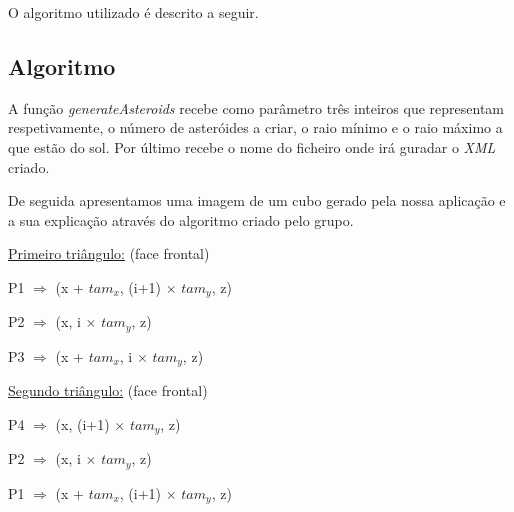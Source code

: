 \documentclass[a4paper]{article}
\begin{document}
O algoritmo utilizado é descrito a seguir.

\subsection{Algoritmo}
A função \textit{generateAsteroids} recebe como parâmetro três inteiros que representam respetivamente, o número de asteróides a criar, o raio mínimo e o raio máximo a que estão do sol. Por último recebe o nome do ficheiro onde irá guradar o \emph{XML} criado.

De seguida apresentamos uma imagem de um cubo gerado pela nossa aplicação e a sua explicação através do algoritmo criado pelo grupo.

 \vspace{0.5cm}

      \underline{Primeiro triângulo:} (face frontal)

      \vspace{0.5cm}

          \hspace{0.5cm} P1 $\Rightarrow$ (x + $tam_{x}$, (i+1) $\times$ $tam_{y}$, z)

      \vspace{0.2cm}

          \hspace{0.5cm} P2 $\Rightarrow$ (x, i $\times$ $tam_{y}$, z)

      \vspace{0.2cm}

          \hspace{0.5cm} P3 $\Rightarrow$ (x + $tam_{x}$, i $\times$ $tam_{y}$, z)

      \vspace{0.5cm}

      \underline{Segundo triângulo:} (face frontal)

      \vspace{0.5cm}

          \hspace{0.5cm} P4 $\Rightarrow$ (x, (i+1) $\times$ $tam_{y}$, z)

      \vspace{0.2cm}

          \hspace{0.5cm} P2 $\Rightarrow$ (x, i $\times$ $tam_{y}$, z)

      \vspace{0.2cm}

          \hspace{0.5cm} P1 $\Rightarrow$ (x + $tam_{x}$, (i+1) $\times$ $tam_{y}$, z)
\end{document}
